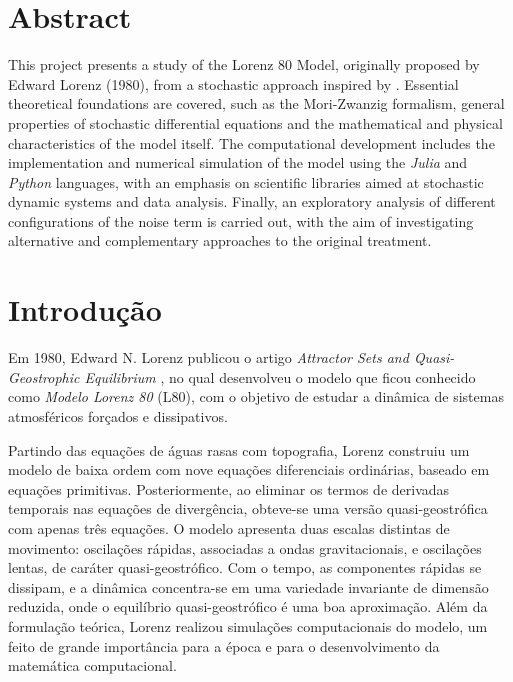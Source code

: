 \documentclass[12pt]{article}
\newenvironment{resumo}{
  \fontsize{10pt}{12pt}\selectfont  %
  \setstretch{1}                    %
  \par\noindent                     %
  \justifying                      %
}{
  \par
}
\begin{document}
\section*{Abstract}
\begin{resumo}
    This project presents a study of the Lorenz 80 Model, originally proposed by Edward Lorenz (1980), from a stochastic approach inspired by \citet{Chekroun2021}. Essential theoretical foundations are covered, such as the Mori-Zwanzig formalism, general properties of stochastic differential equations and the mathematical and physical characteristics of the model itself. The computational development includes the implementation and numerical simulation of the model using the \textit{Julia} and \textit{Python} languages, with an emphasis on scientific libraries aimed at stochastic dynamic systems and data analysis. Finally, an exploratory analysis of different configurations of the noise term is carried out, with the aim of investigating alternative and complementary approaches to the original treatment.
\end{resumo}

\newpage

\section*{Introdução}

Em 1980, Edward N. Lorenz publicou o artigo \textit{Attractor Sets and Quasi-Geostrophic Equilibrium} \citep{Lorenz1980}, no qual desenvolveu o modelo que ficou conhecido como \textit{Modelo Lorenz 80} (L80), com o objetivo de estudar a dinâmica de sistemas atmosféricos forçados e dissipativos.

Partindo das equações de águas rasas com topografia, Lorenz construiu um modelo de baixa ordem com nove equações diferenciais ordinárias, baseado em equações primitivas. Posteriormente, ao eliminar os termos de derivadas temporais nas equações de divergência, obteve-se uma versão quasi-geostrófica com apenas três equações. O modelo apresenta duas escalas distintas de movimento: oscilações rápidas, associadas a ondas gravitacionais, e oscilações lentas, de caráter quasi-geostrófico. Com o tempo, as componentes rápidas se dissipam, e a dinâmica concentra-se em uma variedade invariante de dimensão reduzida, onde o equilíbrio quasi-geostrófico é uma boa aproximação. Além da formulação teórica, Lorenz realizou simulações computacionais do modelo, um feito de grande importância para a época e para o desenvolvimento da matemática computacional.
\end{document}
